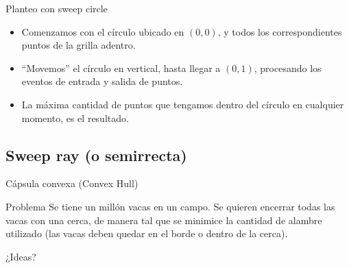 \documentclass[compress]{beamer}
\newcommand{\bigpause}{\bigskip \pause}
\begin{document}
\begin{frame}{Planteo con sweep circle}

\begin{itemize}
    \item Comenzamos con el círculo ubicado en $(0,0)$, y todos los correspondientes puntos de la grilla adentro.
    \item ``Movemos'' el círculo en vertical, hasta llegar a $(0,1)$, procesando los eventos de entrada y salida de puntos.
    \item La máxima cantidad de puntos que tengamos dentro del círculo en cualquier momento, es el resultado.
\end{itemize}

\pause


\end{frame}

\subsection{Sweep ray (o semirrecta)}

\begin{frame}{C\'apsula convexa (Convex Hull)}
\begin{block}{Problema}
Se tiene un mill\'on vacas en un campo. Se quieren encerrar todas las vacas con una cerca, de manera tal que se minimice la cantidad de alambre utilizado (las vacas deben quedar en el borde o dentro de la cerca).
\end{block}

¿Ideas? \bigpause

\end{frame}
\end{document}
